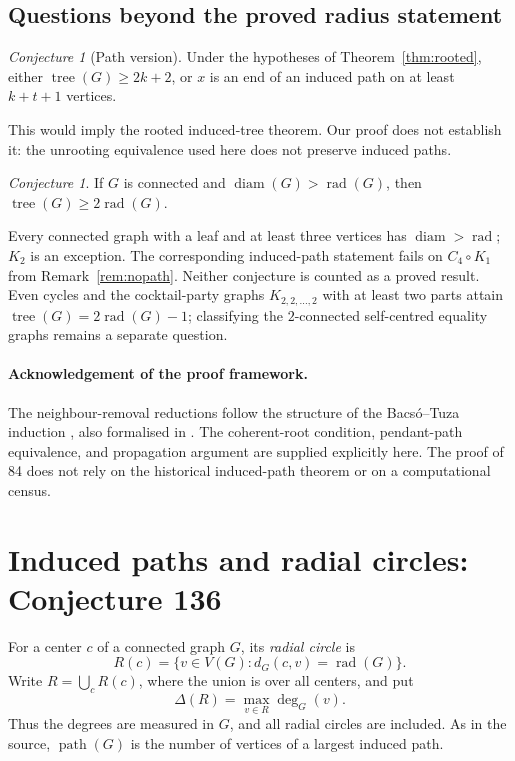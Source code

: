 \documentclass[11pt,a4paper]{article}
\theoremstyle{remark}
\newtheorem{conjecture}[theorem]{Conjecture}
\newcommand{\rad}{\operatorname{rad}}
\newcommand{\diam}{\operatorname{diam}}
\newcommand{\tr}{\tree}
\newcommand{\tree}{\operatorname{tree}}
\begin{document}

\subsection{Questions beyond the proved radius statement}
\label{sec:open}
\begin{conjecture}[Path version]\label{conj:path}
Under the hypotheses of Theorem~\ref{thm:rooted}, either $\tr(G)\ge2k+2$,
or $x$ is an end of an induced path on at least $k+t+1$ vertices.
\end{conjecture}
This would imply the rooted induced-tree theorem. Our proof does not
establish it: the unrooting
equivalence used here does not preserve induced paths.
\begin{conjecture}\label{conj:sc}
If $G$ is connected and $\diam(G)>\rad(G)$, then $\tr(G)\ge2\rad(G)$.
\end{conjecture}
Every connected graph with a leaf and at least three vertices has
$\diam>\rad$; $K_2$ is an exception. The corresponding induced-path
statement fails on $C_4\circ K_1$ from Remark~\ref{rem:nopath}.
Neither conjecture is counted as a proved result. Even cycles and the
cocktail-party graphs $K_{2,2,\ldots,2}$ with at least two parts attain
$\tr(G)=2\rad(G)-1$; classifying the $2$-connected self-centred equality
graphs remains a separate question.

\paragraph{Acknowledgement of the proof framework.}
The neighbour-removal reductions follow the structure of the
Bacs\'o--Tuza induction \cite{BT90}, also formalised in \cite{Mak}.
The coherent-root condition, pendant-path equivalence, and propagation
argument are supplied explicitly here. The proof of 84 does not rely
on the historical induced-path theorem or on a computational census.
\section{Induced paths and radial circles: Conjecture 136}
\label{r3p:sec136}

For a center $c$ of a connected graph $G$, its \emph{radial circle} is
\[
 R(c)=\{v\in V(G):d_G(c,v)=\rad(G)\}.
\]
Write $R=\bigcup_c R(c)$, where the union is over all centers, and put
\[
 \Delta(R)=\max_{v\in R}\deg_G(v).
\]
Thus the degrees are measured in $G$, and all radial circles are included.
As in the source, $\operatorname{path}(G)$ is the number of vertices of a
largest induced path.
\end{document}

